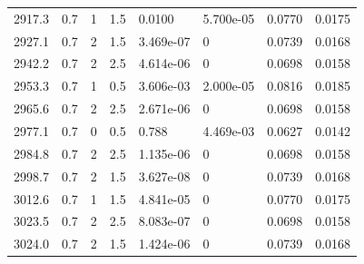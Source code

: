 \documentclass[preview]{standalone}
\begin{document}
{{{{{{{\begin{tabular}{L{1.2cm}C{1.2cm} C{0.3cm}C{0.5cm} C{1.4cm}C{1.4cm} C{1.4cm}C{1.4cm}}
  2917.3  &   0.7  & 1     & 1.5 &  0.0100  & 5.700e-05  & 0.0770 &  0.0175   \\ 
  2927.1  &   0.7  & 2     & 1.5 &  3.469e-07  & 0  & 0.0739 &  0.0168   \\ 
  2942.2  &   0.7  & 2     & 2.5 &  4.614e-06  & 0  & 0.0698 &  0.0158   \\ 
  2953.3  &   0.7  & 1     & 0.5 &  3.606e-03  & 2.000e-05  & 0.0816 &  0.0185   \\ 
  2965.6  &   0.7  & 2     & 2.5 &  2.671e-06  & 0  & 0.0698 &  0.0158   \\ 
  2977.1  &   0.7  & 0     & 0.5 &  0.788  & 4.469e-03  & 0.0627 &  0.0142   \\ 
  2984.8  &   0.7  & 2     & 2.5 &  1.135e-06  & 0  & 0.0698 &  0.0158   \\ 
  2998.7  &   0.7  & 2     & 1.5 &  3.627e-08  & 0  & 0.0739 &  0.0168   \\ 
  3012.6  &   0.7  & 1     & 1.5 &  4.841e-05  & 0  & 0.0770 &  0.0175   \\ 
  3023.5  &   0.7  & 2     & 2.5 &  8.083e-07  & 0  & 0.0698 &  0.0158   \\ 
  3024.0  &   0.7  & 2     & 1.5 &  1.424e-06  & 0  & 0.0739 &  0.0168   \\ 
\hline 
\end{tabular} 

}}}}}}}
\end{document}
